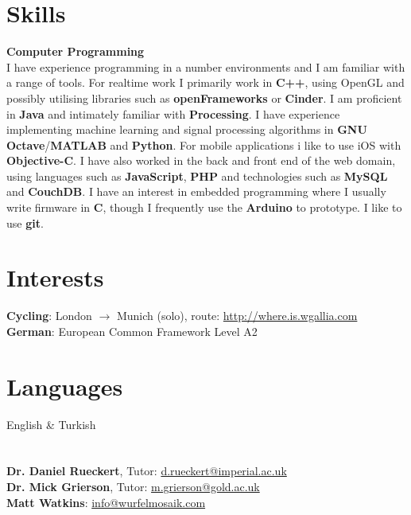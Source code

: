 \documentclass[margin,line,a4paper]{resume}
\begin{document}
\begin{resume}
\newpage
\section{\mysidestyle Skills}

\textbf{Computer Programming} \vspace{1mm} \\
I have experience programming in a number environments and I am
familiar with a range of tools. For realtime work I primarily work in
\textbf{C++}, using OpenGL and possibly utilising
libraries such as \textbf{openFrameworks} or \textbf{Cinder}. I am
proficient in \textbf{Java} and intimately familiar with
\textbf{Processing}. I have experience implementing machine learning
and signal processing algorithms in \textbf{GNU
  Octave}/\textbf{MATLAB} and \textbf{Python}. For mobile applications
i like to use iOS with \textbf{Objective-C}. I have also worked in the
back and front end of the web domain, using languages such as
\textbf{JavaScript}, \textbf{PHP} and technologies such as
\textbf{MySQL} and \textbf{CouchDB}. I have an interest in embedded
programming where I usually write firmware in \textbf{C}, though I
frequently use the \textbf{Arduino} to prototype. I like to use
\textbf{git}.

\section{\mysidestyle Interests}

\textbf{Cycling}: London $\rightarrow$ Munich (solo), route: \href{http://where.is.wgallia.com}{http://where.is.wgallia.com} \vspace{1mm} \\
\textbf{German}: European Common Framework Level A2

\section{\mysidestyle Languages}

English \& Turkish

\section{}

\hypersetup{urlcolor=Fuchsia}
%
\textbf{Dr. Daniel Rueckert}, Tutor: \href{mailto:d.rueckert@imperial.ac.uk}{d.rueckert@imperial.ac.uk}
\vspace{2mm} \\
\textbf{Dr. Mick Grierson}, Tutor: \href{mailto:m.grierson@gold.ac.uk}{m.grierson@gold.ac.uk}
\vspace{2mm} \\
\textbf{Matt Watkins}: \href{info@wurfelmosaik.com}{info@wurfelmosaik.com}
\vspace{2mm} \\

\end{resume}
\end{document}

